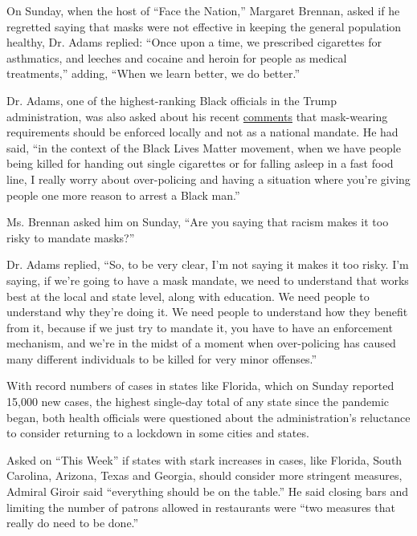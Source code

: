 On Sunday, when the host of ``Face the Nation,'' Margaret Brennan, asked
if he regretted saying that masks were not effective in keeping the
general population healthy, Dr. Adams replied: ``Once upon a time, we
prescribed cigarettes for asthmatics, and leeches and cocaine and heroin
for people as medical treatments,'' adding, ``When we learn better, we
do better.''

Dr. Adams, one of the highest-ranking Black officials in the Trump
administration, was also asked about his recent
\href{https://www.fox5dc.com/news/us-surgeon-general-stresses-importance-of-wearing-face-coverings-to-reduce-spread-of-covid-19}{comments}
that mask-wearing requirements should be enforced locally and not as a
national mandate. He had said, ``in the context of the Black Lives
Matter movement, when we have people being killed for handing out single
cigarettes or for falling asleep in a fast food line, I really worry
about over-policing and having a situation where you're giving people
one more reason to arrest a Black man.''

Ms. Brennan asked him on Sunday, ``Are you saying that racism makes it
too risky to mandate masks?''

Dr. Adams replied, ``So, to be very clear, I'm not saying it makes it
too risky. I'm saying, if we're going to have a mask mandate, we need to
understand that works best at the local and state level, along with
education. We need people to understand why they're doing it. We need
people to understand how they benefit from it, because if we just try to
mandate it, you have to have an enforcement mechanism, and we're in the
midst of a moment when over-policing has caused many different
individuals to be killed for very minor offenses.''

With record numbers of cases in states like Florida, which on Sunday
reported 15,000 new cases, the highest single-day total of any state
since the pandemic began, both health officials were questioned about
the administration's reluctance to consider returning to a lockdown in
some cities and states.

Asked on ``This Week'' if states with stark increases in cases, like
Florida, South Carolina, Arizona, Texas and Georgia, should consider
more stringent measures, Admiral Giroir said ``everything should be on
the table.'' He said closing bars and limiting the number of patrons
allowed in restaurants were ``two measures that really do need to be
done.''

\href{https://www.nytimes3xbfgragh.onion/news-event/coronavirus?action=click\&pgtype=Article\&state=default\&region=MAIN_CONTENT_3\&context=storylines_faq}{}

